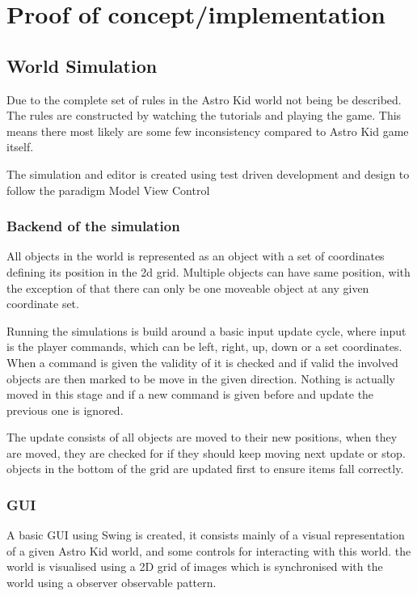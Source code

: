 \chapter{Proof of concept/implementation}

\section{World Simulation}
	Due to the complete set of rules in the Astro Kid world not being be described. The rules are constructed by watching the tutorials and playing the game. This means there most likely are some few inconsistency compared to Astro Kid game itself.

	The simulation and editor is created using test driven development and design to follow the paradigm Model View Control 

	\subsection{Backend of the simulation}
	All objects in the world is represented as an object with a set of coordinates defining its position in the 2d grid. Multiple objects can have same position, with the exception of that there can only be one moveable object at any given coordinate set.
	
	Running the simulations is build around a basic input update cycle, where input is the player commands, which can be left, right, up, down or a set coordinates. When a command is given the validity of it is checked and if valid the involved objects are then marked to be move in the given direction. Nothing is actually moved in this stage and if a new command is given before and update the previous one is ignored.
	
	The update consists of all objects are moved to their new positions, when they are moved, they are checked for if they should keep moving next update or stop. objects in the bottom of the grid are updated first to ensure items fall correctly.
	
	
	\subsection{GUI}
	A basic GUI using Swing is created, it consists mainly of a visual representation of a given Astro Kid world, and some controls for interacting with this world. the world is visualised using a 2D grid of images which is synchronised with the world using a observer observable pattern.
	
